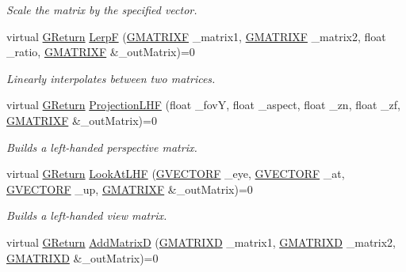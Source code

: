 \begin{DoxyCompactItemize}
\begin{DoxyCompactList}\small\item\em Scale the matrix by the specified vector. \end{DoxyCompactList}\item 
virtual \mbox{\hyperlink{namespace_g_w_a67a839e3df7ea8a5c5686613a7a3de21}{G\+Return}} \mbox{\hyperlink{class_g_w_1_1_m_a_t_h_1_1_g_matrix_a677534c072e7cb8d93223fdc05ae1957}{LerpF}} (\mbox{\hyperlink{struct_g_w_1_1_m_a_t_h_1_1_g_m_a_t_r_i_x_f}{G\+M\+A\+T\+R\+I\+XF}} \+\_\+matrix1, \mbox{\hyperlink{struct_g_w_1_1_m_a_t_h_1_1_g_m_a_t_r_i_x_f}{G\+M\+A\+T\+R\+I\+XF}} \+\_\+matrix2, float \+\_\+ratio, \mbox{\hyperlink{struct_g_w_1_1_m_a_t_h_1_1_g_m_a_t_r_i_x_f}{G\+M\+A\+T\+R\+I\+XF}} \&\+\_\+out\+Matrix)=0
\begin{DoxyCompactList}\small\item\em Linearly interpolates between two matrices. \end{DoxyCompactList}\item 
virtual \mbox{\hyperlink{namespace_g_w_a67a839e3df7ea8a5c5686613a7a3de21}{G\+Return}} \mbox{\hyperlink{class_g_w_1_1_m_a_t_h_1_1_g_matrix_a1e46cce75764e9b92a31a84ceb9ffc3b}{Projection\+L\+HF}} (float \+\_\+fovY, float \+\_\+aspect, float \+\_\+zn, float \+\_\+zf, \mbox{\hyperlink{struct_g_w_1_1_m_a_t_h_1_1_g_m_a_t_r_i_x_f}{G\+M\+A\+T\+R\+I\+XF}} \&\+\_\+out\+Matrix)=0
\begin{DoxyCompactList}\small\item\em Builds a left-\/handed perspective matrix. \end{DoxyCompactList}\item 
virtual \mbox{\hyperlink{namespace_g_w_a67a839e3df7ea8a5c5686613a7a3de21}{G\+Return}} \mbox{\hyperlink{class_g_w_1_1_m_a_t_h_1_1_g_matrix_a33fa9f8f7f8b700f170d1e2654bbfc3b}{Look\+At\+L\+HF}} (\mbox{\hyperlink{struct_g_w_1_1_m_a_t_h_1_1_g_v_e_c_t_o_r_f}{G\+V\+E\+C\+T\+O\+RF}} \+\_\+eye, \mbox{\hyperlink{struct_g_w_1_1_m_a_t_h_1_1_g_v_e_c_t_o_r_f}{G\+V\+E\+C\+T\+O\+RF}} \+\_\+at, \mbox{\hyperlink{struct_g_w_1_1_m_a_t_h_1_1_g_v_e_c_t_o_r_f}{G\+V\+E\+C\+T\+O\+RF}} \+\_\+up, \mbox{\hyperlink{struct_g_w_1_1_m_a_t_h_1_1_g_m_a_t_r_i_x_f}{G\+M\+A\+T\+R\+I\+XF}} \&\+\_\+out\+Matrix)=0
\begin{DoxyCompactList}\small\item\em Builds a left-\/handed view matrix. \end{DoxyCompactList}\item 
virtual \mbox{\hyperlink{namespace_g_w_a67a839e3df7ea8a5c5686613a7a3de21}{G\+Return}} \mbox{\hyperlink{class_g_w_1_1_m_a_t_h_1_1_g_matrix_a9ae855c7cfbfa08c84bd76a556302bc5}{Add\+MatrixD}} (\mbox{\hyperlink{struct_g_w_1_1_m_a_t_h_1_1_g_m_a_t_r_i_x_d}{G\+M\+A\+T\+R\+I\+XD}} \+\_\+matrix1, \mbox{\hyperlink{struct_g_w_1_1_m_a_t_h_1_1_g_m_a_t_r_i_x_d}{G\+M\+A\+T\+R\+I\+XD}} \+\_\+matrix2, \mbox{\hyperlink{struct_g_w_1_1_m_a_t_h_1_1_g_m_a_t_r_i_x_d}{G\+M\+A\+T\+R\+I\+XD}} \&\+\_\+out\+Matrix)=0

\end{DoxyCompactItemize}
